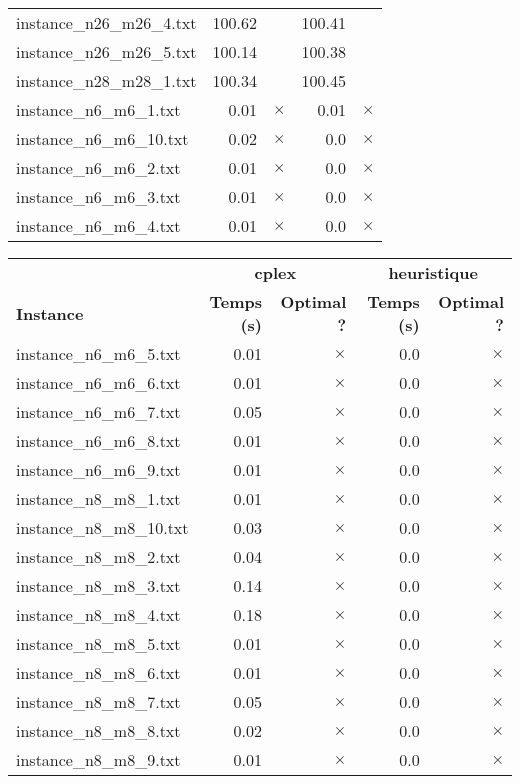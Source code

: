 \documentclass{article}
\begin{document}
\begin{center}
\begin{tabular}{lrrrr}
instance\_n26\_m26\_4.txt & 100.62 & 
 & 100.41 & 
\\
instance\_n26\_m26\_5.txt & 100.14 & 
 & 100.38 & 
\\
instance\_n28\_m28\_1.txt & 100.34 & 
 & 100.45 & 
\\
instance\_n6\_m6\_1.txt & 0.01 & 
$\times$
 & 0.01 & 
$\times$
\\
instance\_n6\_m6\_10.txt & 0.02 & 
$\times$
 & 0.0 & 
$\times$
\\
instance\_n6\_m6\_2.txt & 0.01 & 
$\times$
 & 0.0 & 
$\times$
\\
instance\_n6\_m6\_3.txt & 0.01 & 
$\times$
 & 0.0 & 
$\times$
\\
instance\_n6\_m6\_4.txt & 0.01 & 
$\times$
 & 0.0 & 
$\times$
\\
\hline\end{tabular}
\end{center}

\newpage
\begin{center}
\renewcommand{\arraystretch}{1.4} 
 \begin{tabular}{lrrrr}
	\hline
 & \multicolumn{2}{c}{\textbf{cplex}} & \multicolumn{2}{c}{\textbf{heuristique}}\\
\textbf{Instance}  & \textbf{Temps (s)} & \textbf{Optimal ?}  & \textbf{Temps (s)} & \textbf{Optimal ?} \\\hline

instance\_n6\_m6\_5.txt & 0.01 & 
$\times$
 & 0.0 & 
$\times$
\\
instance\_n6\_m6\_6.txt & 0.01 & 
$\times$
 & 0.0 & 
$\times$
\\
instance\_n6\_m6\_7.txt & 0.05 & 
$\times$
 & 0.0 & 
$\times$
\\
instance\_n6\_m6\_8.txt & 0.01 & 
$\times$
 & 0.0 & 
$\times$
\\
instance\_n6\_m6\_9.txt & 0.01 & 
$\times$
 & 0.0 & 
$\times$
\\
instance\_n8\_m8\_1.txt & 0.01 & 
$\times$
 & 0.0 & 
$\times$
\\
instance\_n8\_m8\_10.txt & 0.03 & 
$\times$
 & 0.0 & 
$\times$
\\
instance\_n8\_m8\_2.txt & 0.04 & 
$\times$
 & 0.0 & 
$\times$
\\
instance\_n8\_m8\_3.txt & 0.14 & 
$\times$
 & 0.0 & 
$\times$
\\
instance\_n8\_m8\_4.txt & 0.18 & 
$\times$
 & 0.0 & 
$\times$
\\
instance\_n8\_m8\_5.txt & 0.01 & 
$\times$
 & 0.0 & 
$\times$
\\
instance\_n8\_m8\_6.txt & 0.01 & 
$\times$
 & 0.0 & 
$\times$
\\
instance\_n8\_m8\_7.txt & 0.05 & 
$\times$
 & 0.0 & 
$\times$
\\
instance\_n8\_m8\_8.txt & 0.02 & 
$\times$
 & 0.0 & 
$\times$
\\
instance\_n8\_m8\_9.txt & 0.01 & 
$\times$
 & 0.0 & 
$\times$
\\
\hline\end{tabular}
\end{center}
\end{document}
